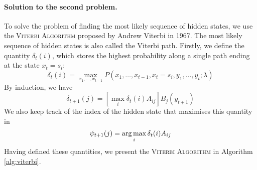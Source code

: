 \paragraph{Solution to the second problem.} 
	To solve the problem of finding the most likely sequence of hidden states, we use the \textsc{Viterbi Algorithm} proposed by Andrew Viterbi in 1967. The most likely sequence of hidden states is also called the Viterbi path. Firstly, we define the quantity $\delta_t(i)$, which stores the highest probability along a single path ending at the state $x_t = s_i$:
	\begin{equation}
		\delta_t(i) = \max_{x_1, \dotsc, x_{t - 1}} P\left( x_1, \dotsc, x_{t - 1}, x_t = s_i, y_1, \dotsc, y_t; \lambda \right)
	\end{equation}
By induction, we have
	\begin{equation}
		\delta_{t + 1}(j) = \left[ \max_i \delta_t(i) A_{ij} \right] B_j(y_{t + 1})
	\end{equation}
We also keep track of the index of the hidden state that maximises this quantity in
	\begin{equation}
		\psi_{t + 1}(j) = \operatorname*{arg\,max}_i \delta_t(i) A_{ij}
	\end{equation}
Having defined these quantities, we present the \textsc{Viterbi Algorithm} in Algorithm \ref{alg:viterbi}.
